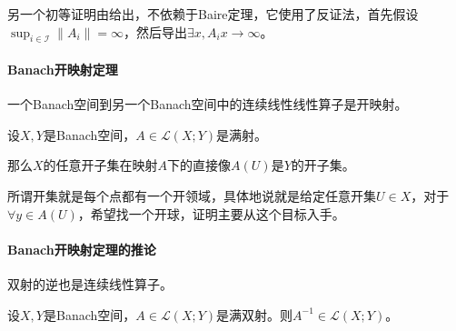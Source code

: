 另一个初等证明由\cite{Alan_D_Sokal_2011}给出，不依赖于Baire定理，它使用了反证法，首先假设$\sup_{i\in \mathcal{I}}\|A_i\|=\infty$，然后导出$\exists x,A_ix\rightarrow\infty$。

\paragraph*{Banach开映射定理}一个Banach空间到另一个Banach空间中的连续线性线性算子是开映射。
\begin{theorem}[Banach开映射定理]
设$X, Y$是Banach空间，$A\in\mathcal{L}(X;Y)$是满射。

那么$X$的任意开子集在映射$A$下的直接像$A(U)$是$Y$的开子集。
\end{theorem}
所谓开集就是每个点都有一个开领域，具体地说就是给定任意开集$U\in X$，对于$\forall y\in A(U)$，希望找一个开球，证明主要从这个目标入手。

\paragraph*{Banach开映射定理的推论}双射的逆也是连续线性算子。
\begin{theorem}[Banach开映射定理]
设$X, Y$是Banach空间，$A\in\mathcal{L}(X;Y)$是满双射。则$A^{-1}\in\mathcal{L}(X;Y)$。
\end{theorem}
